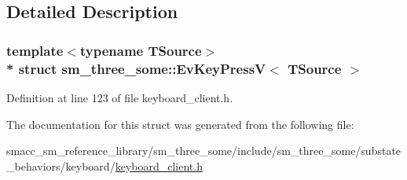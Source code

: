 \subsection{Detailed Description}
\subsubsection*{template$<$typename T\+Source$>$\\*
struct sm\+\_\+three\+\_\+some\+::\+Ev\+Key\+Press\+V$<$ T\+Source $>$}



Definition at line 123 of file keyboard\+\_\+client.\+h.



The documentation for this struct was generated from the following file\+:\begin{DoxyCompactItemize}
\item 
smacc\+\_\+sm\+\_\+reference\+\_\+library/sm\+\_\+three\+\_\+some/include/sm\+\_\+three\+\_\+some/substate\+\_\+behaviors/keyboard/\hyperlink{keyboard__client_8h}{keyboard\+\_\+client.\+h}\end{DoxyCompactItemize}
